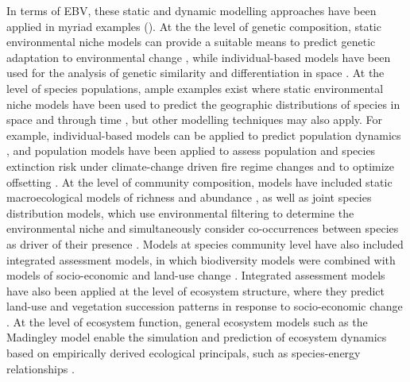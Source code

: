 In terms of EBV, these static and dynamic modelling approaches have been applied in myriad examples (). At the the level of genetic composition, static environmental niche models can provide a suitable means to predict genetic adaptation to environmental change \citep{sillero_distribution_2020}, while individual-based models have been used for the analysis of genetic similarity and differentiation in space \citep{cornell_unified_2019}. At the level of species populations, ample examples exist where static environmental niche models have been used to predict the geographic distributions of species in space and through time \citep{struebig_anticipated_2015}, but other modelling techniques may also apply. For example, individual-based models can be applied to predict population dynamics \citep{deangelis_individual-based_2014}, and population models have been applied to assess population and species extinction risk under climate-change driven fire regime changes \citep{cadenhead_climate_2016} and to optimize offsetting \citep{marshall_quantifying_2021}. At the level of community composition, models have included static macroecological models of richness and abundance \citep{newbold_global_2015}, as well as joint species distribution models, which use environmental filtering to determine the environmental niche and simultaneously consider co-occurrences between species as driver of their presence \citep{pollock_understanding_2014}. Models at species community level have also included integrated assessment models, in which biodiversity models were combined with models of socio-economic and land-use change \citep{leclere_bending_2020}. Integrated assessment models have also been applied at the level of ecosystem structure, where they predict land-use and vegetation succession patterns in response to socio-economic change \citep{fricko_marker_2017, kriegler_fossil-fueled_2017}. At the level of ecosystem function, general ecosystem models such as the Madingley model enable the simulation and prediction of ecosystem dynamics based on empirically derived ecological principals, such as species-energy relationships \citep{harfoot_emergent_2014}. 

